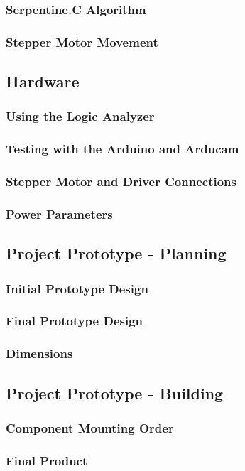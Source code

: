 \subsubsection{Serpentine.C Algorithm}
\subsubsection{Stepper Motor Movement}
\subsection{Hardware}
\subsubsection{Using the Logic Analyzer}
\subsubsection{Testing with the Arduino and Arducam}
\subsubsection{Stepper Motor and Driver Connections}
\subsubsection{Power Parameters}
\subsection{Project Prototype - Planning}
\subsubsection{Initial Prototype Design}
\subsubsection{Final Prototype Design}
\subsubsection{Dimensions}
\subsection{Project Prototype - Building}
\subsubsection{Component Mounting Order}
\subsubsection{Final Product}

